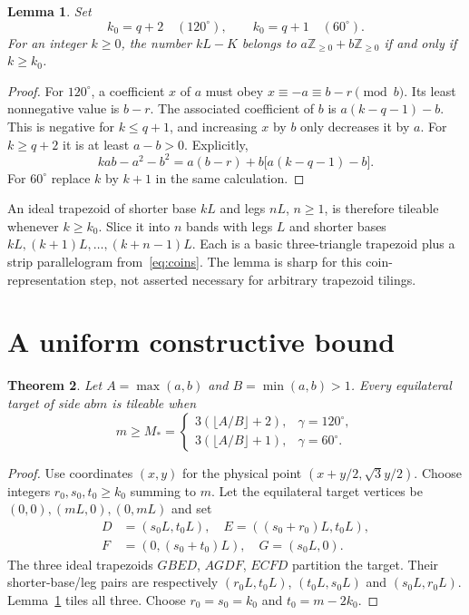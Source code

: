 \documentclass[11pt]{article}
\newtheorem{theorem}{Theorem}
\newtheorem{lemma}[theorem]{Lemma}
\newcommand{\NN}{\mathbb Z_{\ge0}}
\begin{document}
\begin{lemma}\label{lem:residue}
Set
\[
k_0=q+2\quad(120^\circ),\qquad k_0=q+1\quad(60^\circ).
\]
For an integer $k\ge0$, the number $kL-K$ belongs to $a\NN+b\NN$ if and only if $k\ge k_0$.
\end{lemma}
\begin{proof}
For $120^\circ$, a coefficient $x$ of $a$ must obey $x\equiv-a\equiv b-r\pmod b$. Its least nonnegative value is $b-r$. The associated coefficient of $b$ is $a(k-q-1)-b$. This is negative for $k\le q+1$, and increasing $x$ by $b$ only decreases it by $a$. For $k\ge q+2$ it is at least $a-b>0$. Explicitly,
\begin{equation}
kab-a^2-b^2=a(b-r)+b\bigl[a(k-q-1)-b\bigr].\label{eq:coins}
\end{equation}
For $60^\circ$ replace $k$ by $k+1$ in the same calculation.
\end{proof}

An ideal trapezoid of shorter base $kL$ and legs $nL$, $n\ge1$, is therefore tileable whenever $k\ge k_0$. Slice it into $n$ bands with legs $L$ and shorter bases $kL,(k+1)L,\ldots,(k+n-1)L$. Each is a basic three-triangle trapezoid plus a strip parallelogram from~\eqref{eq:coins}. The lemma is sharp for this coin-representation step, not asserted necessary for arbitrary trapezoid tilings.

\section{A uniform constructive bound}
\begin{theorem}\label{thm:construction}
Let $A=\max(a,b)$ and $B=\min(a,b)>1$. Every equilateral target of side $abm$ is tileable when
\[
\boxed{m\ge M_*=
\begin{cases}
3(\lfloor A/B\rfloor+2),&\gamma=120^\circ,\\
3(\lfloor A/B\rfloor+1),&\gamma=60^\circ.
\end{cases}}
\]
\end{theorem}
\begin{proof}
Use coordinates $(x,y)$ for the physical point $(x+y/2,\sqrt3y/2)$. Choose integers $r_0,s_0,t_0\ge k_0$ summing to $m$. Let the equilateral target vertices be $(0,0),(mL,0),(0,mL)$ and set
\[
\begin{split}
D&=(s_0L,t_0L),\quad E=((s_0+r_0)L,t_0L),\\
F&=(0,(s_0+t_0)L),\quad G=(s_0L,0).
\end{split}
\]
The three ideal trapezoids $GBED$, $AGDF$, $ECFD$ partition the target. Their shorter-base/leg pairs are respectively $(r_0L,t_0L)$, $(t_0L,s_0L)$ and $(s_0L,r_0L)$. Lemma~\ref{lem:residue} tiles all three. Choose $r_0=s_0=k_0$ and $t_0=m-2k_0$.
\end{proof}
\end{document}

